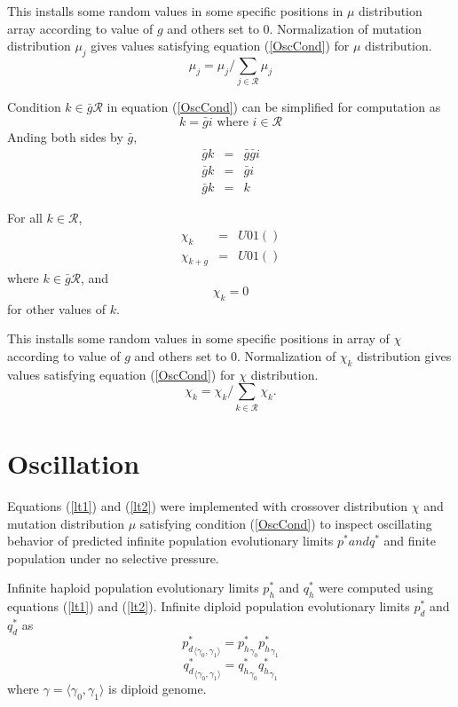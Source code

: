This installs some random values in some specific positions in $\mu$ distribution array according to value of $g$ and others set to $0$. 
Normalization of mutation distribution $\mu_j$ gives values satisfying equation (\ref{OscCond}) for $\mu$ distribution.
\[
\mu_j = \mu_j / \sum \limits_{j \in \mathcal{R} } \mu_j
\]


Condition $k \in \bar{g} \mathcal{R}$ in equation (\ref{OscCond}) can be simplified for computation as
\[
k = \bar{g} i  \text{ where $i \in \mathcal{R}$}
\]
Anding both sides by $\bar{g}$,
\begin{eqnarray*}
\bar{g} k & = & \bar{g} \bar{g} i \\
\bar{g} k & = & \bar{g} i \\
\bar{g} k & = & k 
\end{eqnarray*}

For all $k \in \mathcal{R}$,
\begin{eqnarray*}
\chi_k & = & U01() \\
\chi_{k+g} & = & U01() 
\end{eqnarray*}
where $k \in \bar{g} \mathcal{R}$, and
\[
\chi_k = 0
\]
for other values of $k$. \newline

This installs some random values in some specific positions in array of $\chi$ according to value of $g$ and others set to $0$. Normalization of $\chi_k$ distribution gives values satisfying equation (\ref{OscCond}) for $\chi$ distribution.
\[
\chi_k = \chi_k/\sum\limits_{k \in \mathcal{R}} \chi_k.
\]

\section{Oscillation}
\label{Oscillation}

Equations (\ref{lt1}) and (\ref{lt2}) were implemented with crossover distribution $\chi$ and mutation distribution $\mu$ satisfying condition (\ref{OscCond}) to inspect oscillating behavior of predicted infinite population evolutionary limits $p^{\ast} and q^{\ast}$ and finite population under no selective pressure.

Infinite haploid population evolutionary limits $p_h^{\ast}$ and $q_h^{\ast}$ were computed using equations (\ref{lt1}) and (\ref{lt2}). Infinite diploid population evolutionary limits $p_d^{\ast}$ and $q_d^{\ast}$ as
\[
{p_d^{\ast}}_{\langle \gamma_0, \gamma_1 \rangle} = {p_h^{\ast}}_{\gamma_0} {p_h^{\ast}}_{\gamma_1}
\]
\[
{q_d^{\ast}}_{\langle \gamma_0, \gamma_1 \rangle} = {q_h^{\ast}}_{\gamma_0} {q_h^{\ast}}_{\gamma_1}
\]
where $\gamma = \langle \gamma_0, \gamma_1 \rangle$ is diploid genome.


